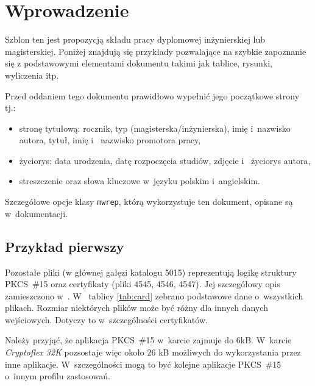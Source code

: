 \chapter{Wprowadzenie}

Szblon ten jest propozycją składu pracy dyplomowej inżynierskiej lub
magisterskiej. Poniżej znajdują się przykłady pozwalające na
szybkie zapoznanie się z podstawowymi elementami dokumentu takimi jak
tablice, rysunki, wyliczenia itp.

Przed oddaniem tego dokumentu prawidłowo wypełnić jego początkowe strony
tj.:
\begin{itemize}
\item stronę tytułową: rocznik, typ (magisterska/inżynierska),
imię i~nazwisko autora, tytuł, imię i~ nazwisko promotora pracy,
\item życiorys: data urodzenia, datę rozpoczęcia studiów, zdjęcie i~
życiorys autora,
\item streszczenie oraz słowa kluczowe w~języku polskim i~angielskim.
\end{itemize}

Szczegółowe opcje klasy {\tt mwrep}, którą wykorzystuje ten dokument,
opisane są w~dokumentacji.

\section[Tytuł w paginie][Tytuł w spisie treści]{Przykład pierwszy}

Pozostałe pliki (w głównej gałęzi katalogu 5015) reprezentują logikę struktury
PKCS~\#15 oraz certyfikaty (pliki 4545, 4546, 4547). Jej szczegółowy
opis zamieszczono w~\cite[130-140]{bk:ipki}. W~
tablicy \ref{tab:card} zebrano podstawowe dane o~wszystkich plikach.
Rozmiar niektórych plików może być różny dla innych danych wejściowych.
Dotyczy to w~szczególności certyfikatów.

Należy przyjąć, że aplikacja PKCS~\#15 w~karcie zajmuje do 6kB. W~karcie
{\it Cryptoflex 32K} pozsostaje więc około 26 kB możliwych do wykorzystania
przez inne aplikacje. W~szczególności mogą to być kolejne aplikacje PKCS~\#15
o~innym profilu zastosowań.

